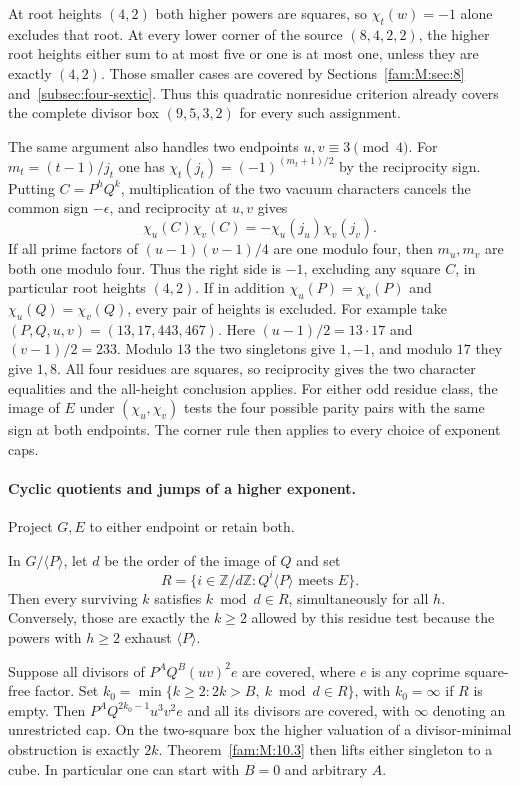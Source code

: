 \documentclass[11pt,a4paper]{article}
\numberwithin{equation}{section}
\theoremstyle{remark}
\begin{document}
At root heights $(4,2)$ both higher powers are squares, so
$\chi_t(w)=-1$ alone excludes that root. At every lower corner
of the source $(8,4,2,2)$, the higher root heights either sum to
at most five or one is at most one, unless they are exactly $(4,2)$.
Those smaller cases are covered by Sections~\ref{fam:M:sec:8} and~\ref{subsec:four-sextic}. Thus this
quadratic nonresidue criterion already covers the complete divisor box
$(9,5,3,2)$ for every such assignment.

The same argument also handles two endpoints $u,v\equiv3\pmod4$.
For $m_t=(t-1)/j_t$ one has
$\chi_t(j_t)=(-1)^{(m_t+1)/2}$ by the reciprocity sign.
Putting $C=P^hQ^k$, multiplication of the two vacuum characters
cancels the common sign $-\epsilon$, and reciprocity at $u,v$ gives
\[
          \chi_u(C)\chi_v(C)=-\chi_u(j_u)\chi_v(j_v).
\]
If all prime factors of $(u-1)(v-1)/4$ are one modulo four,
then $m_u,m_v$ are both one modulo four. Thus the right side is
$-1$, excluding any square $C$, in particular root heights $(4,2)$.
If in addition $\chi_u(P)=\chi_v(P)$ and $\chi_u(Q)=\chi_v(Q)$,
every pair of heights is excluded.
For example take $(P,Q,u,v)=(13,17,443,467)$. Here $(u-1)/2=13\cdot17$
and $(v-1)/2=233$. Modulo $13$ the two singletons give $1,-1$,
and modulo $17$ they give $1,8$. All four residues are squares, so
reciprocity gives the two character equalities and the all-height
conclusion applies. For either odd residue class, the image of $E$ under
$(\chi_u,\chi_v)$ tests the four possible parity pairs with the same
sign at both endpoints. The corner rule then applies to every
choice of exponent caps.

\paragraph{Cyclic quotients and jumps of a higher exponent.}
Project $G,E$ to either endpoint or retain both.

In $G/\langle P\rangle$, let $d$ be the order of the image of $Q$ and set
\[
 R=\{i\in\mathbb Z/d\mathbb Z: Q^i\langle P\rangle
                 \text{ meets }E\}.
\]
Then every surviving $k$ satisfies $k\bmod d\in R$, simultaneously
for all $h$. Conversely, those are exactly the $k\ge2$ allowed by
this residue test because the powers with $h\ge2$ exhaust $\langle P\rangle$.

Suppose all divisors of $P^A Q^B(uv)^2e$ are covered, where $e$ is
any coprime square-free factor. Set $k_0=\min\{k\ge2:
2k>B,\ k\bmod d\in R\}$, with $k_0=\infty$ if $R$ is empty.
Then $P^A Q^{2k_0-1}u^3v^2e$ and all its divisors are covered,
with $\infty$ denoting an unrestricted cap. On the two-square box
the higher valuation of a divisor-minimal obstruction is exactly
$2k$. Theorem~\ref{fam:M:10.3} then lifts either singleton to a cube.
In particular one can start with $B=0$ and arbitrary $A$.
\end{document}
